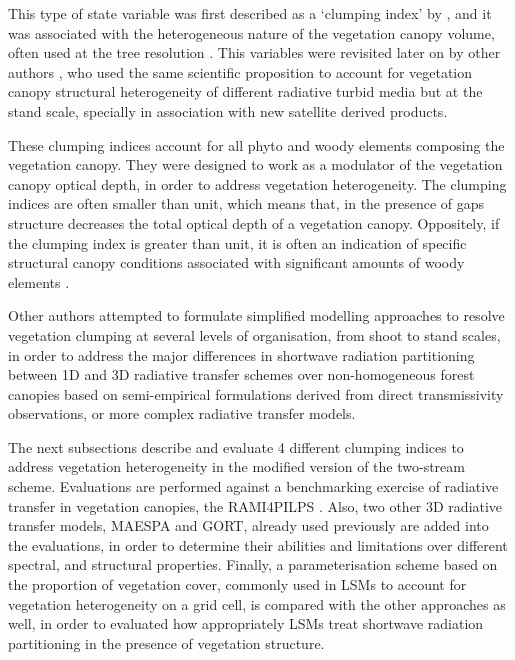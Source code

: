 \documentclass[a4paper,11pt]{report}
\begin{document}
This type of state variable was first described as a `clumping index' by \citet{Nilson1971}, and it was associated with the heterogeneous nature of the vegetation canopy volume, often used at the tree resolution \citep{Norman1974,chen1992,Chen1996}. This variables were revisited later on by other authors \citep{Pinty2004,pinty2006}, who used the same scientific proposition to account for vegetation canopy structural heterogeneity of different radiative turbid media but at the stand scale, specially in association with new satellite derived products.

These clumping indices account for all phyto and woody elements composing the vegetation canopy. They were designed to work as a modulator of the vegetation canopy optical depth, in order to address vegetation heterogeneity. The clumping indices are often smaller than unit, which means that, in the presence of gaps structure decreases the total optical depth of a vegetation canopy. Oppositely, if the clumping index is greater than unit, it is often an indication of specific structural canopy conditions associated with significant amounts of woody elements \citep{pinty2006}.

Other authors \citep{Kucharik1999,Ni-Meister2010} attempted to formulate simplified modelling approaches to resolve vegetation clumping at several levels of organisation, from shoot to stand scales, in order to address the major differences in shortwave radiation partitioning between 1D and 3D radiative transfer schemes over non-homogeneous forest canopies based on semi-empirical formulations derived from direct transmissivity observations, or more complex radiative transfer models.

The next subsections describe and evaluate 4 different clumping indices to address vegetation heterogeneity in the modified version of the two-stream scheme. Evaluations are performed against a benchmarking exercise of radiative transfer in vegetation canopies, the RAMI4PILPS \citep{Widlowski2011}. Also, two other 3D radiative transfer models, MAESPA and GORT, already used previously are added into the evaluations, in order to determine their abilities and limitations over different spectral, and structural properties. Finally, a parameterisation scheme based on the proportion of vegetation cover, commonly used in LSMs to account for vegetation heterogeneity on a grid cell, is compared with the other approaches as well, in order to evaluated how appropriately LSMs treat shortwave radiation partitioning in the presence of vegetation structure.
\end{document}
